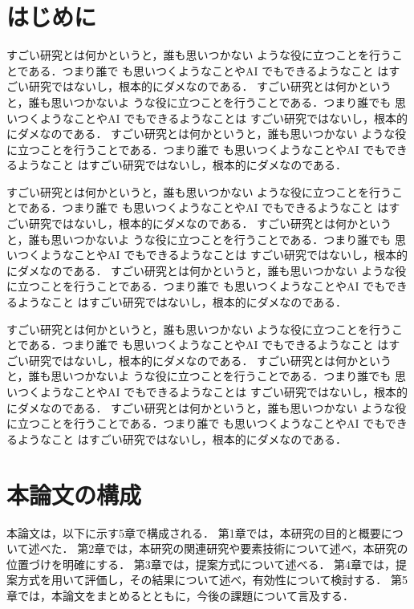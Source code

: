 %
%
\section{はじめに}
すごい研究とは何かというと，誰も思いつかない
ような役に立つことを行うことである．つまり誰で
も思いつくようなことやAI でもできるようなこと
はすごい研究ではないし，根本的にダメなのである．
すごい研究とは何かというと，誰も思いつかないよ
うな役に立つことを行うことである．つまり誰でも
思いつくようなことやAI でもできるようなことは
すごい研究ではないし，根本的にダメなのである．
すごい研究とは何かというと，誰も思いつかない
ような役に立つことを行うことである．つまり誰で
も思いつくようなことやAI でもできるようなこと
はすごい研究ではないし，根本的にダメなのである．

すごい研究とは何かというと，誰も思いつかない
ような役に立つことを行うことである．つまり誰で
も思いつくようなことやAI でもできるようなこと
はすごい研究ではないし，根本的にダメなのである．
すごい研究とは何かというと，誰も思いつかないよ
うな役に立つことを行うことである．つまり誰でも
思いつくようなことやAI でもできるようなことは
すごい研究ではないし，根本的にダメなのである．
すごい研究とは何かというと，誰も思いつかない
ような役に立つことを行うことである．つまり誰で
も思いつくようなことやAI でもできるようなこと
はすごい研究ではないし，根本的にダメなのである．

すごい研究とは何かというと，誰も思いつかない
ような役に立つことを行うことである．つまり誰で
も思いつくようなことやAI でもできるようなこと
はすごい研究ではないし，根本的にダメなのである．
すごい研究とは何かというと，誰も思いつかないよ
うな役に立つことを行うことである．つまり誰でも
思いつくようなことやAI でもできるようなことは
すごい研究ではないし，根本的にダメなのである．
すごい研究とは何かというと，誰も思いつかない
ような役に立つことを行うことである．つまり誰で
も思いつくようなことやAI でもできるようなこと
はすごい研究ではないし，根本的にダメなのである．


\section{本論文の構成}
本論文は，以下に示す5章で構成される．
第1章では，本研究の目的と概要について述べた．
第2章では，本研究の関連研究や要素技術について述べ，本研究の位置づけを明確にする．
第3章では，提案方式について述べる．
第4章では，提案方式を用いて評価し，その結果について述べ，有効性について検討する．
第5章では，本論文をまとめるとともに，今後の課題について言及する．

